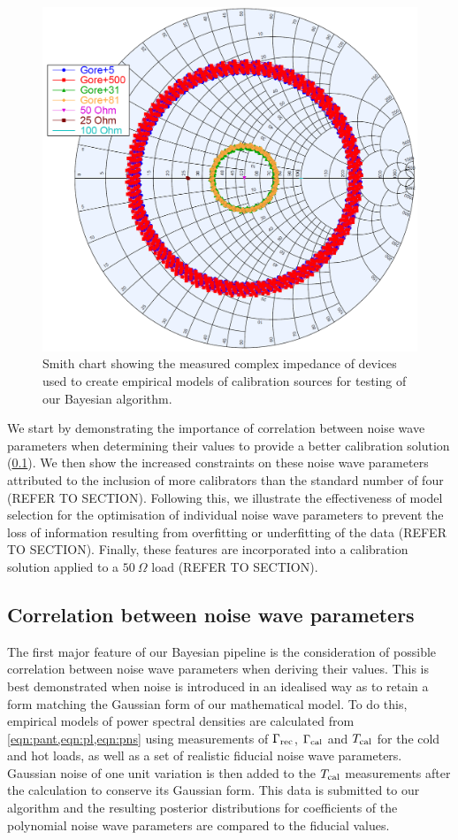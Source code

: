 \begin{figure}
    \centering
    \includegraphics[width=.5\columnwidth]{sim_data_smith}
    \caption{Smith chart showing the measured complex impedance of devices used to create empirical models of calibration sources for testing of our Bayesian algorithm.
    \label{fig:sim_data_smith}}
\end{figure}

We start by demonstrating the importance of correlation between noise wave parameters when determining their values to provide a better calibration solution (\cref{sec:correlation}). We then show the increased constraints on these noise wave parameters attributed to the inclusion of more calibrators than the standard number of four (REFER TO SECTION). Following this, we illustrate the effectiveness of model selection for the optimisation of individual noise wave parameters to prevent the loss of information resulting from overfitting or underfitting of the data (REFER TO SECTION). Finally, these features are incorporated into a calibration solution applied to a $50 \ \Omega$ load (REFER TO SECTION).


\subsection{Correlation between noise wave parameters}\label{sec:correlation}
The first major feature of our Bayesian pipeline is the consideration of possible correlation between noise wave parameters when deriving their values. This is best demonstrated when noise is introduced in an idealised way as to retain a form matching the Gaussian form of our mathematical model. To do this, empirical models of power spectral densities are calculated from \cref{eqn:pant,eqn:pl,eqn:pns} using measurements of $\Gamma_{\mathrm{rec}}$, $\Gamma_{\mathrm{cal}}$ and $T_{\mathrm{cal}}$ for the cold and hot loads, as well as a set of realistic fiducial noise wave parameters. Gaussian noise of one unit variation is then added to the $T_{\mathrm{cal}}$ measurements after the calculation to conserve its Gaussian form. This data is submitted to our algorithm and the resulting posterior distributions for coefficients of the polynomial noise wave parameters are compared to the fiducial values.

